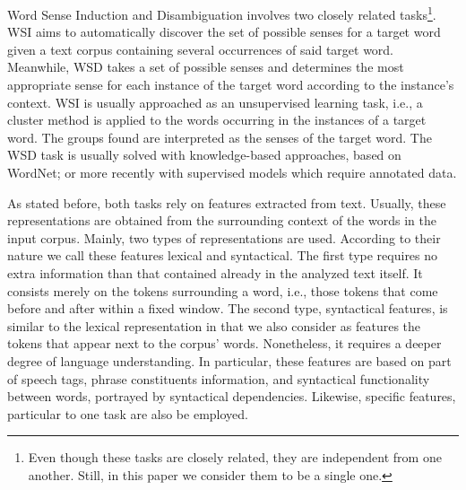 \documentclass{llncs}
\begin{document}
Word Sense Induction and Disambiguation involves two closely related tasks\footnote{Even though these tasks are closely related, they are independent from one another. Still, in this paper we consider them to be a single one.}. WSI aims to automatically discover the set of possible senses for a target word given a text corpus containing several occurrences of said target word. Meanwhile, WSD takes a set of possible senses and determines the most appropriate sense for each instance of the target word according to the instance's context. WSI is usually approached as an unsupervised learning task, i.e., a cluster method is applied to the words occurring in the instances of a target word. The groups found are interpreted as the senses of the target word. The WSD task is usually solved with knowledge-based approaches, based on WordNet; or more recently with supervised models which require annotated data.

As stated before, both tasks rely on features extracted from text. Usually, these representations are obtained from the surrounding context of the words in the  input corpus. Mainly,  two types of representations are used. According to their nature we call these features lexical and syntactical. 	The first type requires no extra information than that contained already in the analyzed text itself. It consists merely on the tokens surrounding a word, i.e., those tokens that come before and after within a fixed window. The second type, syntactical features, is similar to the lexical representation in that we also consider as features the tokens that appear next to the corpus' words. Nonetheless, it requires a deeper degree of language understanding. In particular, these features are based on part of speech tags, phrase constituents information, and syntactical functionality between words, portrayed by syntactical dependencies. Likewise, specific features, particular to one task are also be employed.


\end{document}
